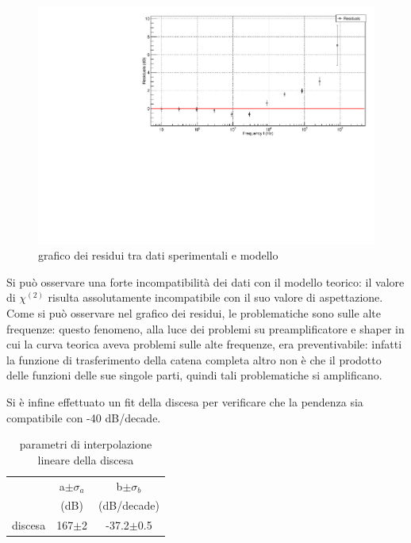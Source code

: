 \documentclass{article}
\begin{document}
\begin{center}
\begin{figure}[H]
\centering
\includegraphics[scale=0.4, angle=0]{bodecatenaresidui.pdf}
\caption{grafico dei residui tra dati sperimentali e modello}
\label{fig:catenaBODE_res}
\end{figure}
\end{center}

Si può osservare una forte incompatibilità dei dati con il modello teorico: il valore
di $\chi^{(2)}$ risulta assolutamente incompatibile con il suo valore di aspettazione.
Come si può osservare nel grafico dei residui, le problematiche sono sulle alte frequenze:
questo fenomeno, alla luce dei problemi su preamplificatore e shaper in cui la curva teorica
aveva problemi sulle alte frequenze, era preventivabile: infatti la funzione di trasferimento
della catena completa altro non è che il prodotto delle funzioni delle sue singole parti, quindi 
tali problematiche si amplificano.

Si è infine effettuato un fit della discesa per verificare che la pendenza sia compatibile con -40 dB/decade.

\begin{table}[ht]
    \centering
    \begin{tabular}{rcccc}
        \toprule
                &\multicolumn{2}{c}{a$\pm \sigma_a$} &\multicolumn{2}{c}{b$\pm \sigma_b$}\\
                &\multicolumn{2}{c}{(dB)}  &\multicolumn{2}{c}{(dB/decade)}\\
        \midrule
        discesa &\multicolumn{2}{c}{167$\pm$2}&\multicolumn{2}{c}{-37.2$\pm$0.5}\\
        \bottomrule
    \end{tabular}
    \caption{parametri di interpolazione lineare della discesa}
\end{table}
\end{document}
